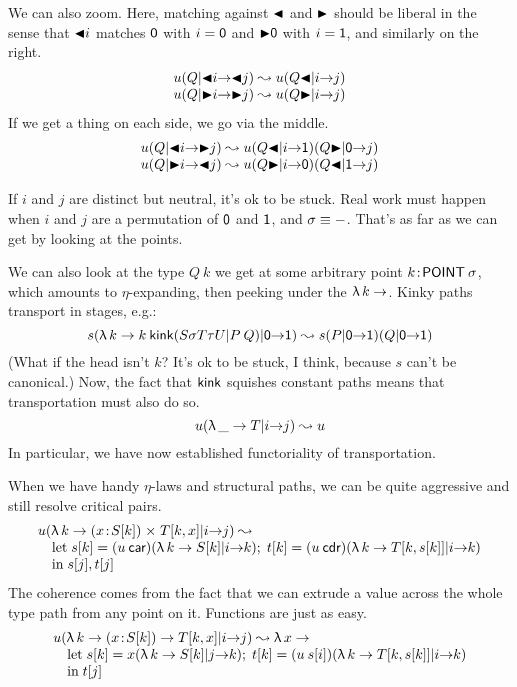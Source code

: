 \documentclass{article}
\begin{document}
We can also zoom. Here, matching against $\SL$ and $\SR$ should be liberal
in the sense that $\SL i$ matches $\PL$ with $i=\PL$ and $\SR\PL$ with $i=\PR$,
and similarly on the right.
\[\begin{array}{c}
\xport Q{\SL i}{\SL j}u \leadsto
  \xport{Q\SL}iju
\\
\xport Q{\SR i}{\SR j}u \leadsto
  \xport{Q\SR}iju
\end{array}\]
If we get a thing on each side, we go via the middle.
\[\begin{array}{c}
\xport Q{\SL i}{\SR j}u \leadsto
  \xport{Q\SR}\PL j{\xport{Q\SL}i\PR u}
\\
\xport Q{\SR i}{\SL j}u \leadsto
  \xport{Q\SL}\PR j{\xport{Q\SR}i\PL u}
\end{array}\]

If $i$ and $j$ are distinct but neutral, it's ok to be stuck.
Real work must happen when $i$ and $j$ are a permutation of $\PL$ and $\PR$,
and $\sigma\equiv\da$. That's as far as we can get by looking at the points.

We can also look at the type $Q\:k$ we get at some arbitrary point
$k\hb\PO\sigma$, which amounts to $\eta$-expanding, then peeking under the $\LA k{}$.
Kinky paths transport in stages, e.g.:
\[
\xport{\LA k{k\:\kink(S\sigma T\tau U|P\:Q)}}\PL\PR s\leadsto
  \xport Q\PL\PR{\xport P\PL\PR s}
\]
(What if the head isn't $k$? It's ok to be stuck, I think, because $s$ can't be canonical.)
Now, the fact that $\kink$ squishes constant paths means that transportation must also
do so.
\[
\xport{\LA \_ T}iju \leadsto u
\]
In particular, we have now established functoriality of transportation.

When we have handy $\eta$-laws and structural paths, we can be quite aggressive and
still resolve critical pairs.
\[\begin{array}{l}
\xport{\LA k{\SG x{S\sbs k}{T\sbs{k,x}}}}iju \leadsto\\
\quad
\mbox{let}\;s\sbs k = \xport{\LA k{S\sbs k}}ik{(u\car)};
          \;t\sbs k = \xport{\LA k{T\sbs{k,s\sbs k}}}ik{(u\cdr)}\\
\quad
\mbox{in}\;s\sbs j,t\sbs j
\end{array}\]
The coherence comes from the fact that we can extrude a value across the whole
type path from any point on it. Functions are just as easy.
\[\begin{array}{l}
\xport{\LA k{\PI x{S\sbs k}{T\sbs{k,x}}}}iju \leadsto \LA x{}\\
\quad
\mbox{let}\;s\sbs k = \xport{\LA k{S\sbs k}}jkx;
          \;t\sbs k = \xport{\LA k{T\sbs{k,s\sbs k}}}ik{(u\:s\sbs i)}\\
\quad
\mbox{in}\;t\sbs j
\end{array}\]
\end{document}
